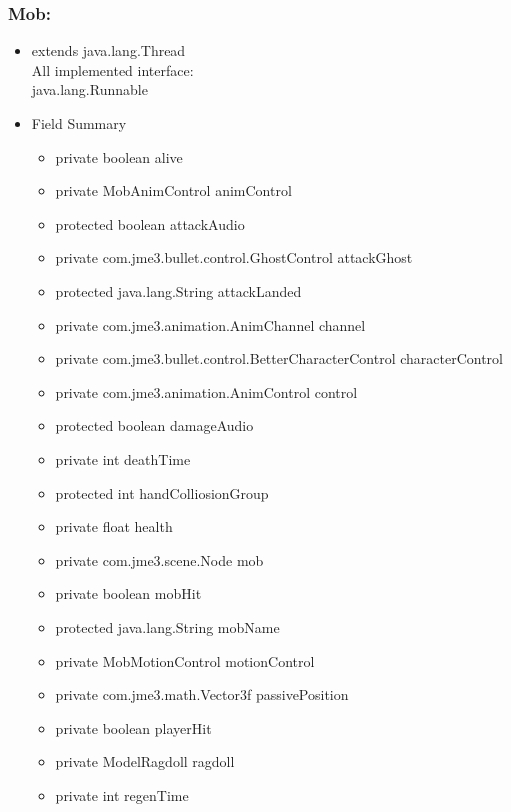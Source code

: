 \documentclass[letterpaper]{article}
\begin{document}
						\subsubsection*{Mob:}
						\vspace{0.1in}
							\begin{itemize}
								\item 	extends java.lang.Thread\\
										All implemented interface: \\
										java.lang.Runnable \\	
								\item	Field Summary
										\begin{itemize}
											\item	private boolean	alive 
											\item	private MobAnimControl	animControl 
											\item	protected boolean	attackAudio 
											\item	private com.jme3.bullet.control.GhostControl	attackGhost 
											\item	protected java.lang.String	attackLanded 
											\item	private com.jme3.animation.AnimChannel	channel 
											\item	private com.jme3.bullet.control.BetterCharacterControl	characterControl 
											\item	private com.jme3.animation.AnimControl	control 
											\item	protected boolean	damageAudio 
											\item	private int	deathTime 
											\item	protected int	handColliosionGroup 
											\item	private float	health 
											\item	private com.jme3.scene.Node	mob 
											\item	private boolean	mobHit 
											\item	protected java.lang.String	mobName 
											\item	private MobMotionControl	motionControl 
											\item	private com.jme3.math.Vector3f	passivePosition 
											\item	private boolean	playerHit 
											\item	private ModelRagdoll	ragdoll 
											\item	private int	regenTime 

\end{itemize}
\end{itemize}
\end{document}
